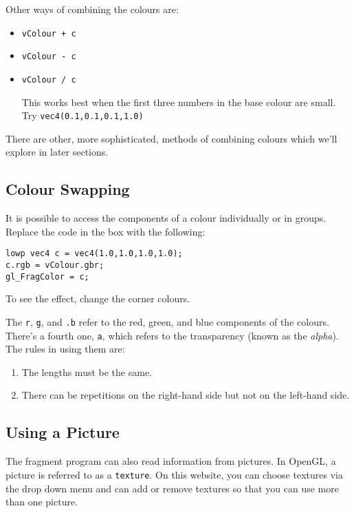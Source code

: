 \documentclass[
  html5,%
  mathml,%
  use filename%
]{internet}
\begin{document}
Other ways of combining the colours are:
%
\begin{itemize}
\item \verb!vColour + c!
\item \verb!vColour - c!
\item \verb!vColour / c!

This works best when the first three numbers in the base colour are small.
Try \verb!vec4(0.1,0.1,0.1,1.0)!
\end{itemize}

There are other, more sophisticated, methods of combining colours which we'll explore in later sections.

\subsection{Colour Swapping}

It is possible to access the components of a colour individually or in groups.
Replace the code in the box with the following:

\begin{tcolorbox}
\begin{verbatim}
lowp vec4 c = vec4(1.0,1.0,1.0,1.0);
c.rgb = vColour.gbr;
gl_FragColor = c;
\end{verbatim}
\end{tcolorbox}

To see the effect, change the corner colours.

The \verb+r+, \verb+g+, and \verb+.b+ refer to the red, green, and blue components of the colours.
There's a fourth one, \verb+a+, which refers to the transparency (known as the \emph{alpha}).
The rules in using them are:
%
\begin{enumerate}
\item The lengths must be the same.
\item There can be repetitions on the right-hand side but not on the left-hand side.
\end{enumerate}

\subsection{Using a Picture}

The fragment program can also read information from pictures.
In OpenGL, a picture is referred to as a \verb+texture+.
On this website, you can choose textures via the drop down menu and can add or remove textures so that you can use more than one picture.
\end{document}
